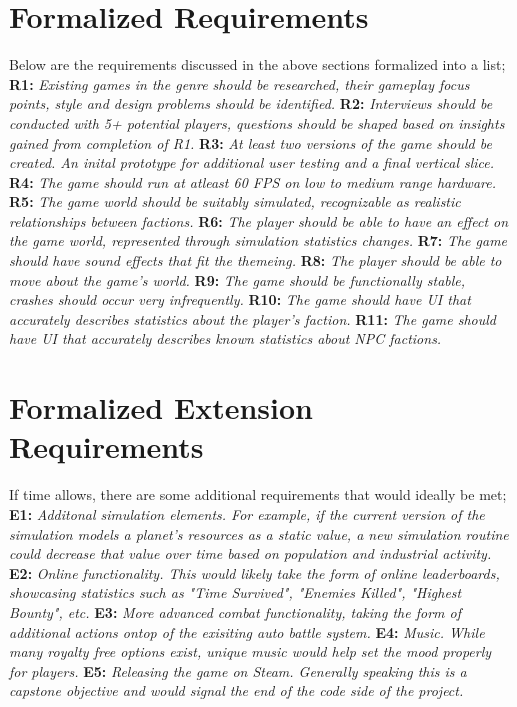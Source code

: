 \documentclass{report}
\newcommand{\req}[2]{\textbf{		#1:  }	\textit{#2}\newline\newline}
\begin{document}
\section{Formalized Requirements}
Below are the requirements discussed in the above sections formalized into a list;
\newline
\newline
\req{R1}{Existing games in the genre should be researched, their gameplay focus points, style and design problems should be identified.}
\req{R2}{Interviews should be conducted with 5+ potential players, questions should be shaped based on insights gained from completion of R1.}
\req{R3}{At least two versions of the game should be created. An inital prototype for additional user testing and a final vertical slice.}
\req{R4}{The game should run at atleast 60 FPS on low to medium range hardware.}
\req{R5}{The game world should be suitably simulated, recognizable as realistic relationships between factions.}
\req{R6}{The player should be able to have an effect on the game world, represented through simulation statistics changes.}
\req{R7}{The game should have sound effects that fit the themeing.}
\req{R8}{The player should be able to move about the game's world.}
\req{R9}{The game should be functionally stable, crashes should occur very infrequently.}
\req{R10}{The game should have UI that accurately describes statistics about the player's faction.}
\req{R11}{The game should have UI that accurately describes known statistics about NPC factions.}

\section{Formalized Extension Requirements}

If time allows, there are some additional requirements that would ideally be met;
\newline
\newline
\req{E1}{Additonal simulation elements. For example, if the current version of the simulation models a planet's resources as a static value, a new simulation routine could decrease that value over time based on population and industrial activity.}
\req{E2}{Online functionality. This would likely take the form of online leaderboards, showcasing statistics such as "Time Survived", "Enemies Killed", "Highest Bounty", etc.}
\req{E3}{More advanced combat functionality, taking the form of additional actions ontop of the exisiting auto battle system. }
\req{E4}{Music. While many royalty free options exist, unique music would help set the mood properly for players.}
\req{E5}{Releasing the game on Steam. Generally speaking this is a capstone objective and would signal the end of the code side of the project. }
\end{document}
